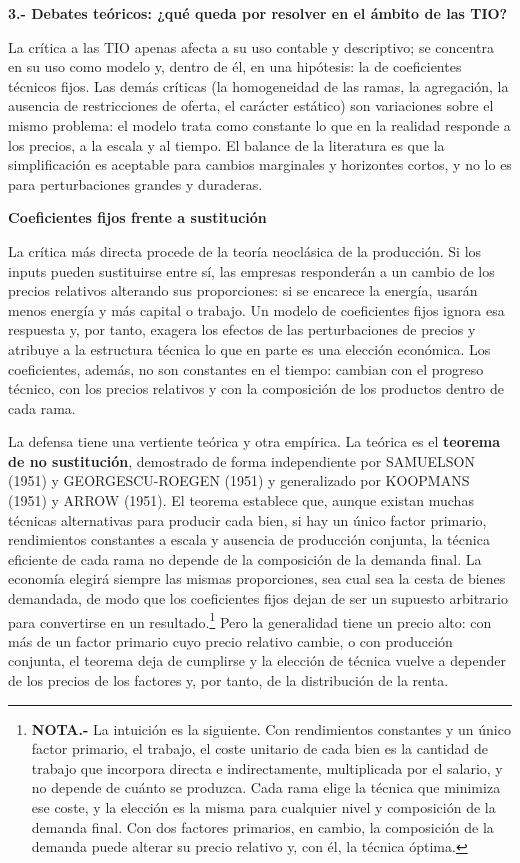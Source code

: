 \documentclass[10pt,a4paper]{article}
\begin{document}
\textbf{3.- Debates teóricos: ¿qué queda por resolver en el ámbito de las TIO?}

La crítica a las TIO apenas afecta a su uso contable y descriptivo; se concentra en su uso como modelo y, dentro de él, en una hipótesis: la de coeficientes técnicos fijos. Las demás críticas (la homogeneidad de las ramas, la agregación, la ausencia de restricciones de oferta, el carácter estático) son variaciones sobre el mismo problema: el modelo trata como constante lo que en la realidad responde a los precios, a la escala y al tiempo. El balance de la literatura es que la simplificación es aceptable para cambios marginales y horizontes cortos, y no lo es para perturbaciones grandes y duraderas.

\textbf{Coeficientes fijos frente a sustitución}

La crítica más directa procede de la teoría neoclásica de la producción. Si los inputs pueden sustituirse entre sí, las empresas responderán a un cambio de los precios relativos alterando sus proporciones: si se encarece la energía, usarán menos energía y más capital o trabajo. Un modelo de coeficientes fijos ignora esa respuesta y, por tanto, exagera los efectos de las perturbaciones de precios y atribuye a la estructura técnica lo que en parte es una elección económica. Los coeficientes, además, no son constantes en el tiempo: cambian con el progreso técnico, con los precios relativos y con la composición de los productos dentro de cada rama.

La defensa tiene una vertiente teórica y otra empírica. La teórica es el \textbf{teorema de no sustitución}, demostrado de forma independiente por SAMUELSON (1951) y GEORGESCU-ROEGEN (1951) y generalizado por KOOPMANS (1951) y ARROW (1951). El teorema establece que, aunque existan muchas técnicas alternativas para producir cada bien, si hay un único factor primario, rendimientos constantes a escala y ausencia de producción conjunta, la técnica eficiente de cada rama no depende de la composición de la demanda final. La economía elegirá siempre las mismas proporciones, sea cual sea la cesta de bienes demandada, de modo que los coeficientes fijos dejan de ser un supuesto arbitrario para convertirse en un resultado.\footnote{%
    \textbf{NOTA.-} La intuición es la siguiente. Con rendimientos constantes y un único factor primario, el trabajo, el coste unitario de cada bien es la cantidad de trabajo que incorpora directa e indirectamente, multiplicada por el salario, y no depende de cuánto se produzca. Cada rama elige la técnica que minimiza ese coste, y la elección es la misma para cualquier nivel y composición de la demanda final. Con dos factores primarios, en cambio, la composición de la demanda puede alterar su precio relativo y, con él, la técnica óptima.
}
Pero la generalidad tiene un precio alto: con más de un factor primario cuyo precio relativo cambie, o con producción conjunta, el teorema deja de cumplirse y la elección de técnica vuelve a depender de los precios de los factores y, por tanto, de la distribución de la renta.
\end{document}
